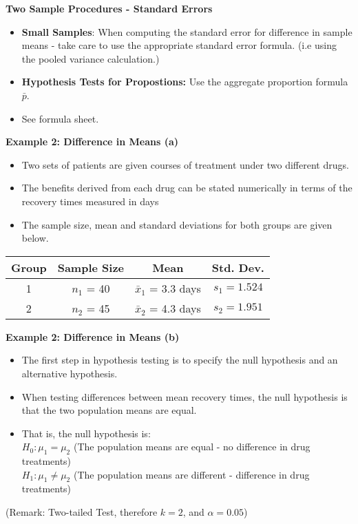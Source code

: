 \documentclass[a4]{beamer}
\begin{document}
\noindent \textbf{Two Sample Procedures - Standard Errors}
\begin{itemize}
\item \textbf{Small Samples}: When computing the standard error for difference in sample means - take care to use the appropriate standard error formula. (i.e using the pooled variance calculation.)
\item \textbf{Hypothesis Tests for Propostions:} Use the aggregate proportion formula $\bar{p}$.
\item See formula sheet.
\end{itemize}


\noindent \textbf{Example 2: Difference in Means (a) }
\begin{itemize}
\item Two sets of patients are given courses of treatment under two different drugs. \item 
The benefits
derived from each drug can be stated numerically in terms of the recovery times measured in days
\item The sample size, mean and standard deviations for both groups are given below.
\end{itemize}
\begin{tabular}{|c|c|c|c|}
\hline Group & Sample Size & Mean & Std. Dev.  \\ 
\hline 1 & $n_1$ = 40 & $\bar{x}_1$ = 3.3 days  &  $s_1 = 1.524$ \\ 
\hline 2 & $n_2$ = 45 & $\bar{x}_2$ = 4.3 days & $s_2 = 1.951 $ \\ 
\hline 
\end{tabular} 




\noindent \textbf{Example 2: Difference in Means (b) }
\begin{itemize}
\item
The first step in hypothesis testing is to specify the null hypothesis and an alternative hypothesis.
\item When testing differences between mean recovery times, the null hypothesis is that the two population means are equal.
\item That is, the null hypothesis is:\\
$H_0: \mu_1 = \mu_2$ (The population means are equal - no difference in drug treatments)\\
$H_1: \mu_1 \neq \mu_2$ (The population means are different - difference in drug treatments)\\
\end{itemize}
(Remark: Two-tailed Test, therefore $k = 2$, and $\alpha = 0.05$)
\end{document}

